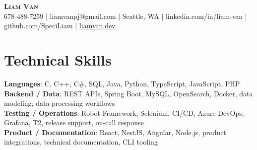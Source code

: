 \documentclass[letterpaper,11pt]{article}
\begin{document}

%
\begin{center}
    \textbf{\Huge \scshape Liam Van} \\ \vspace{1pt}
    \small 678-488-7259 $|$ \small {liamvanpj@gmail.com} $|$ Seattle, WA
 {{$|$ linkedin.com/in/liam-van} {$|$ github.com/SpeciLiam} {$|$ \href{https://liamvan.dev}{liamvan.dev}}}

\end{center}

\section{Technical Skills}
 \begin{itemize}[leftmargin=0.15in, label={}]
    \small{\item{
     \textbf{Languages}{: C, C++, C\#, SQL, Java, Python, TypeScript, JavaScript, PHP} \\
     \textbf{Backend / Data}{: REST APIs, Spring Boot, MySQL, OpenSearch, Docker, data modeling, data-processing workflows} \\
     \textbf{Testing / Operations}{: Robot Framework, Selenium, CI/CD, Azure DevOps, Grafana, T2, release support, on-call response} \\
     \textbf{Product / Documentation}{: React, NestJS, Angular, Node.js, product integrations, technical documentation, CLI tooling} \\
    }}
 \end{itemize}
%
\end{document}
